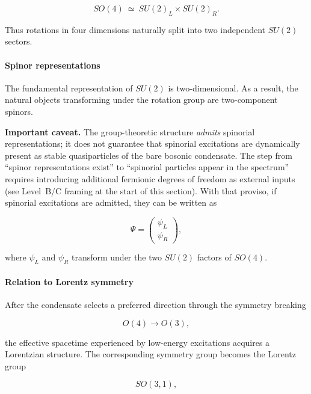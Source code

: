 \documentclass[11pt,a4paper]{article}
\numberwithin{equation}{section}
\begin{document}
\begin{equation}
SO(4)\ \simeq\ SU(2)_L \times SU(2)_R .
\end{equation}

Thus rotations in four dimensions naturally split into two independent
$SU(2)$ sectors.

\paragraph{Spinor representations}

The fundamental representation of $SU(2)$ is two-dimensional.  As a
result, the natural objects transforming under the rotation group are
two-component spinors.

\textbf{Important caveat.}  The group-theoretic structure \emph{admits}
spinorial representations; it does not guarantee that spinorial
excitations are dynamically present as stable quasiparticles of
the bare bosonic condensate.  The step from ``spinor representations
exist'' to ``spinorial particles appear in the spectrum'' requires
introducing additional fermionic degrees of freedom as external
inputs (see Level~B/C framing at the start of this section).
With that proviso, if spinorial excitations are admitted, they can
be written as

\begin{equation}
\Psi =
\begin{pmatrix}
\psi_L \\
\psi_R
\end{pmatrix},
\end{equation}

where $\psi_L$ and $\psi_R$ transform under the two $SU(2)$ factors of
$SO(4)$.

\paragraph{Relation to Lorentz symmetry}

After the condensate selects a preferred direction through the symmetry
breaking

\begin{equation}
O(4) \rightarrow O(3),
\end{equation}

the effective spacetime experienced by low-energy excitations acquires
a Lorentzian structure.  The corresponding symmetry group becomes the
Lorentz group

\begin{equation}
SO(3,1),
\end{equation}
\end{document}

